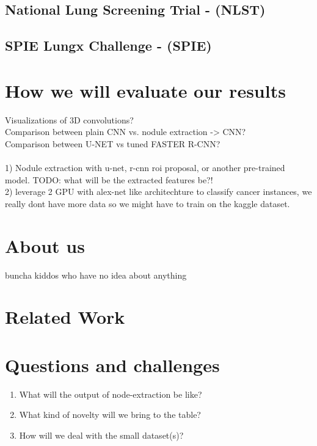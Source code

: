 \documentclass[twocolumn,10pt]{article}
\newcommand{\red}[1]{{\color{red}#1}}
\newcommand{\temp}[1]{{\red{#1}\\}}
\begin{document}
\subsection{National Lung Screening Trial - (NLST)}
\subsection{SPIE Lungx Challenge - (SPIE)}




\section{How we will evaluate our results}
\temp{Visualizations of 3D convolutions?}
\temp{Comparison between plain CNN vs. nodule extraction -> CNN? }
\temp{Comparison between U-NET vs tuned FASTER R-CNN?}
\temp{}
\temp{
	1) Nodule extraction with u-net, r-cnn roi proposal, or another pre-trained
	model. TODO: what will be the extracted features be?! \\
	2) leverage 2 GPU with alex-net like architechture to classify cancer
	instances, we really dont have more data so we might have to train on the
	kaggle dataset.
}

\section{About us}
\temp{buncha kiddos who have no idea about anything}

\section{Related Work}

\section{Questions and challenges}
\begin{enumerate}
	\item What will the output of node-extraction be like?
	\item What kind of novelty will we bring to the table?
	\item How will we deal with the small dataset(s)?
\end{enumerate}
\end{document}
